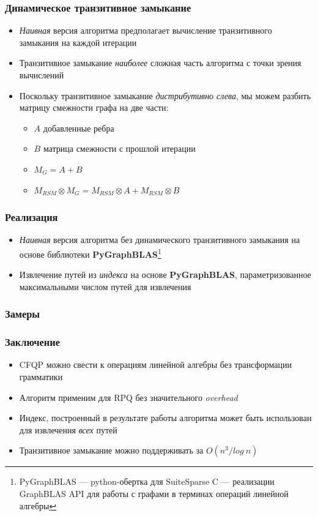 \documentclass[xcolor=table,english,russian]{beamer}
\begin{document}
\begin{frame}[fragile] \frametitle{Динамическое транзитивное замыкание}
    \begin{itemize}
        \item \textit{Наивная} версия алгоритма предполагает вычисление транзитивного замыкания на каждой итерации
        \item Транзитивное замыкание \textit{наиболее} сложная часть алгоритма с точки зрения вычислений
        \item Поскольку транзитивное замыкание \textit{дистрибутивно слева}, мы можем разбить матрицу смежности графа на две части: 
        {
            \begin{itemize}
                \item $A$ добавленные ребра
                \item $B$ матрица смежности с прошлой итерации
                \item $M_G = A + B$
                \item $M_{RSM} \otimes M_G = M_{RSM} \otimes A  + M_{RSM} \otimes B$
            \end{itemize}
        }
    \end{itemize}
\end{frame}

\begin{frame}[fragile] \frametitle{Реализация}
    \begin{itemize}
        \item \textit{Наивная} версия алгоритма без динамического транзитивного замыкания на основе библиотеки \textbf{PyGraphBLAS}\footnote{PyGraphBLAS --- python-обертка для SuiteSparse C --- реализации GraphBLAS API для работы с графами в терминах операций линейной алгебры}
        \item Извлечение путей из \textit{индекса} на основе \textbf{PyGraphBLAS}, параметризованное максимальными числом путей для извлечения 
    \end{itemize}
\end{frame}

\begin{frame}[fragile] \frametitle{Замеры}

\end{frame}

\begin{frame}[fragile] \frametitle{Заключение}
    \begin{itemize}
        \item CFQP можно свести к операциям линейной алгебры без трансформации грамматики
        \item Алгоритм применим для RPQ без значительного \textit{overhead}
        \item Индекс, построенный в результате работы алгоритма может быть использован для извлечения \textit{всех} путей
        \item Транзитивное замыкание можно поддерживать за $O(n^3 / log~n)$ 
    \end{itemize}
\end{frame}
\end{document}
